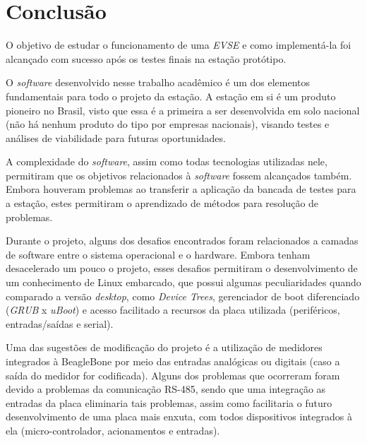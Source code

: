 \chapter{Conclusão}
\label{stateofart:conclusion}

  O objetivo de estudar o funcionamento de uma \textit{\ac{EVSE}} e como implementá-la foi alcançado com sucesso após os testes finais na estação protótipo.

  O \textit{software} desenvolvido nesse trabalho acadêmico é um dos elementos fundamentais para todo o projeto da estação. A estação em si é um produto pioneiro no Brasil, visto que essa é a primeira a ser desenvolvida em solo nacional (não há nenhum produto do tipo por empresas nacionais), visando testes e análises de viabilidade para futuras oportunidades.

  A complexidade do \textit{software}, assim como todas tecnologias utilizadas nele, permitiram que os objetivos relacionados à \textit{software} fossem alcançados também. Embora houveram problemas ao transferir a aplicação da bancada de testes para a estação, estes permitiram o aprendizado de métodos para resolução de problemas.

  Durante o projeto, alguns dos desafios encontrados foram relacionados a camadas de software entre o sistema operacional e o hardware. Embora tenham desacelerado um pouco o projeto, esses desafios permitiram o desenvolvimento de um conhecimento de Linux embarcado, que possui algumas peculiaridades quando comparado a versão \textit{desktop}, como \textit{Device Trees}, gerenciador de boot diferenciado (\textit{GRUB} x \textit{uBoot}) e acesso facilitado a recursos da placa utilizada (periféricos, entradas/saídas e serial).

  Uma das sugestões de modificação do projeto é a utilização de medidores integrados à BeagleBone por meio das entradas analógicas ou digitais (caso a saída do medidor for codificada). Alguns dos problemas que ocorreram foram devido a problemas da comunicação RS-485, sendo que uma integração as entradas da placa eliminaria tais problemas, assim como facilitaria o futuro desenvolvimento de uma placa mais enxuta, com todos dispositivos integrados à ela (micro-controlador, acionamentos e entradas).
  
